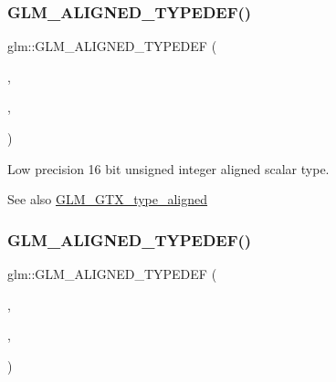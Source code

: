 \subsubsection{\texorpdfstring{G\+L\+M\+\_\+\+A\+L\+I\+G\+N\+E\+D\+\_\+\+T\+Y\+P\+E\+D\+E\+F()}{GLM\_ALIGNED\_TYPEDEF()}\hspace{0.1cm}{\footnotesize\ttfamily [70/209]}}
{\footnotesize\ttfamily glm\+::\+G\+L\+M\+\_\+\+A\+L\+I\+G\+N\+E\+D\+\_\+\+T\+Y\+P\+E\+D\+EF (\begin{DoxyParamCaption}\item[{\hyperlink{group__gtc__type__precision_ga9b8409887319f62f06e664f6ca121b9d}{lowp\+\_\+uint16}}]{,  }\item[{aligned\+\_\+lowp\+\_\+uint16}]{,  }\item[{2}]{ }\end{DoxyParamCaption})}

Low precision 16 bit unsigned integer aligned scalar type. \begin{DoxySeeAlso}{See also}
\hyperlink{group__gtx__type__aligned}{G\+L\+M\+\_\+\+G\+T\+X\+\_\+type\+\_\+aligned} 
\end{DoxySeeAlso}
\mbox{\label{group__gtx__type__aligned_ga7a5009a1d0196bbf21dd7518f61f0249}} 
\subsubsection{\texorpdfstring{G\+L\+M\+\_\+\+A\+L\+I\+G\+N\+E\+D\+\_\+\+T\+Y\+P\+E\+D\+E\+F()}{GLM\_ALIGNED\_TYPEDEF()}\hspace{0.1cm}{\footnotesize\ttfamily [71/209]}}
{\footnotesize\ttfamily glm\+::\+G\+L\+M\+\_\+\+A\+L\+I\+G\+N\+E\+D\+\_\+\+T\+Y\+P\+E\+D\+EF (\begin{DoxyParamCaption}\item[{\hyperlink{group__gtc__type__precision_gaf11e85af414720b4cd12bd57b3a81e68}{lowp\+\_\+uint32}}]{,  }\item[{aligned\+\_\+lowp\+\_\+uint32}]{,  }\item[{4}]{ }\end{DoxyParamCaption})}

